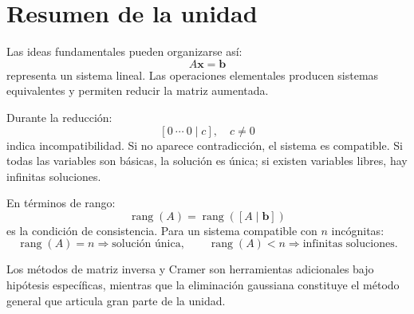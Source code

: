 \documentclass[12pt]{article}
\theoremstyle{remark}
\newcommand{\rank}{\operatorname{rang}}
\begin{document}
\section{Resumen de la unidad}

Las ideas fundamentales pueden organizarse así:
\[
A\mathbf x=\mathbf b
\]
representa un sistema lineal. Las operaciones elementales producen sistemas equivalentes y permiten
reducir la matriz aumentada.

Durante la reducción:
\[
[0\ \cdots\ 0\mid c],\quad c\neq0
\]
indica incompatibilidad. Si no aparece contradicción, el sistema es compatible. Si todas las variables
son básicas, la solución es única; si existen variables libres, hay infinitas soluciones.

En términos de rango:
\[
\boxed{\rank(A)=\rank([A\mid\mathbf b])}
\]
es la condición de consistencia. Para un sistema compatible con $n$ incógnitas:
\[
\rank(A)=n\Longrightarrow\text{solución única},
\qquad
\rank(A)<n\Longrightarrow\text{infinitas soluciones}.
\]

Los métodos de matriz inversa y Cramer son herramientas adicionales bajo hipótesis específicas, mientras
que la eliminación gaussiana constituye el método general que articula gran parte de la unidad.
\end{document}
